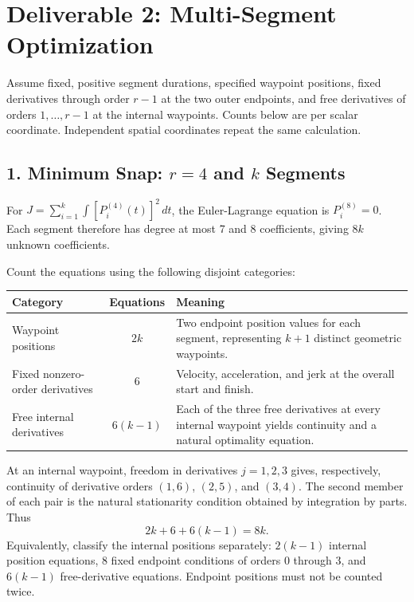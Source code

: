 \clearpage
\section{Deliverable 2: Multi-Segment Optimization}
Assume fixed, positive segment durations, specified waypoint positions, fixed
derivatives through order $r-1$ at the two outer endpoints, and free derivatives
of orders $1,\ldots,r-1$ at the internal waypoints. Counts below are per scalar
coordinate. Independent spatial coordinates repeat the same calculation.

\subsection{1. Minimum Snap: \texorpdfstring{$r=4$ and $k$}{r=4 and k} Segments}
For $J=\sum_{i=1}^k\int[P_i^{(4)}(t)]^2\,dt$, the Euler-Lagrange equation is
$P_i^{(8)}=0$. Each segment therefore has degree at most 7 and 8 coefficients,
giving $8k$ unknown coefficients.

Count the equations using the following disjoint categories:
\begin{center}\small
\begin{tabularx}{\linewidth}{@{}>{\raggedright\arraybackslash}p{35mm}c>{\raggedright\arraybackslash}X@{}}
\toprule
Category & Equations & Meaning \\
\midrule
Waypoint positions & $2k$ & Two endpoint position values for each segment, representing $k+1$ distinct geometric waypoints. \\
Fixed nonzero-order derivatives & $6$ & Velocity, acceleration, and jerk at the overall start and finish. \\
Free internal derivatives & $6(k-1)$ & Each of the three free derivatives at every internal waypoint yields continuity and a natural optimality equation. \\
\bottomrule
\end{tabularx}
\end{center}
At an internal waypoint, freedom in derivatives $j=1,2,3$ gives, respectively,
continuity of derivative orders $(1,6)$, $(2,5)$, and $(3,4)$. The second member
of each pair is the natural stationarity condition obtained by integration by
parts. Thus
\begin{equation}
2k+6+6(k-1)=8k.
\end{equation}
Equivalently, classify the internal positions separately: $2(k-1)$ internal
position equations, 8 fixed endpoint conditions of orders 0 through 3, and
$6(k-1)$ free-derivative equations. Endpoint positions must not be counted twice.

